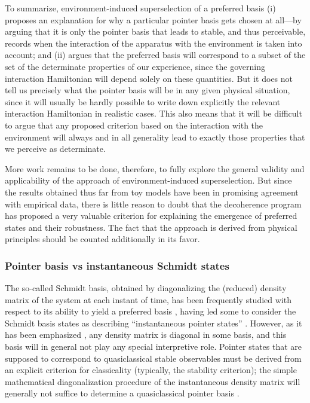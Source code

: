 \documentclass[twocolumn,rmp,aps,amsmath,amsfonts,noshowkeys,noshowpacs]{revtex4}
\begin{document}
To summarize, environment-induced superselection of a preferred basis
(i) proposes an explanation for why a particular pointer basis gets
chosen at all---by arguing that it is only the pointer basis that
leads to stable, and thus perceivable, records when the interaction of
the apparatus with the environment is taken into account; and (ii)
argues that the preferred basis will correspond to a subset of the set
of the determinate properties of our experience, since the governing
interaction Hamiltonian will depend solely on these quantities. But it
does not tell us precisely what the pointer basis will be in any given
physical situation, since it will usually be hardly possible to write
down explicitly the relevant interaction Hamiltonian in realistic
cases.  This also means that it will be difficult to argue that any
proposed criterion based on the interaction with the environment will
always and in all generality lead to exactly those properties that we
perceive as determinate.

More work remains to be done, therefore, to fully explore the general
validity and applicability of the approach of environment-induced
superselection. But since the results obtained thus far from toy
models have been in promising agreement with empirical data, there is
little reason to doubt that the decoherence program has proposed a
very valuable criterion for explaining the emergence of preferred states
and their robustness. The fact that the approach is derived from
physical principles should be counted additionally in its favor.


\subsubsection{Pointer basis vs instantaneous Schmidt states \label{sec:schmidt}}

The so-called Schmidt basis, obtained by diagonalizing the
(reduced) density matrix of the system at each instant of time, has been
frequently studied with respect to its ability to yield a preferred
basis \citep[see, for
example,][]{Zeh:1973:wq,Albrecht:1992:rz,Albrecht:1993:pq}, having led
some to consider the Schmidt basis states as describing
``instantaneous pointer states'' \citep{Albrecht:1992:rz}.  However,
as it has been emphasized \citep[for example, by][]{Zurek:1993:pu},
any density matrix is diagonal in some basis, and this basis will in
general not play any special interpretive role. Pointer states that
are supposed to correspond to quasiclassical stable observables must
be derived from an explicit criterion for classicality (typically, the
stability criterion); the simple mathematical diagonalization
procedure of the instantaneous density matrix will generally not
suffice to determine a quasiclassical pointer basis \citep[see the
studies by][]{Barvinsky:1995:pa,Kent:1997:oz}.
\end{document}
